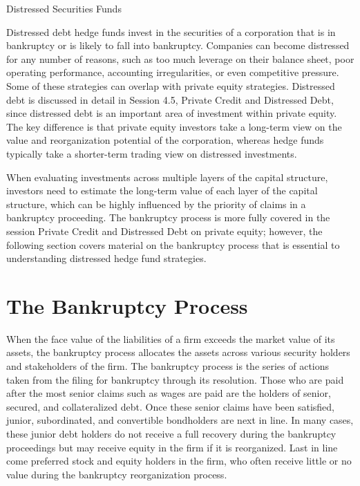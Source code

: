 \documentclass[11pt]{article}
\begin{document}
Distressed Securities Funds

Distressed debt hedge funds invest in the securities of a corporation that is in bankruptcy or is likely to fall into bankruptcy. Companies can become distressed for any number of reasons, such as too much leverage on their balance sheet, poor operating performance, accounting irregularities, or even competitive pressure. Some of these strategies can overlap with private equity strategies. Distressed debt is discussed in detail in Session 4.5, Private Credit and Distressed Debt, since distressed debt is an important area of investment within private equity. The key difference is that private equity investors take a long-term view on the value and reorganization potential of the corporation, whereas hedge funds typically take a shorter-term trading view on distressed investments.

When evaluating investments across multiple layers of the capital structure, investors need to estimate the long-term value of each layer of the capital structure, which can be highly influenced by the priority of claims in a bankruptcy proceeding. The bankruptcy process is more fully covered in the session Private Credit and Distressed Debt on private equity; however, the following section covers material on the bankruptcy process that is essential to understanding distressed hedge fund strategies.

\section*{The Bankruptcy Process}
When the face value of the liabilities of a firm exceeds the market value of its assets, the bankruptcy process allocates the assets across various security holders and stakeholders of the firm. The bankruptcy process is the series of actions taken from the filing for bankruptcy through its resolution. Those who are paid after the most senior claims such as wages are paid are the holders of senior, secured, and collateralized debt. Once these senior claims have been satisfied, junior, subordinated, and convertible bondholders are next in line. In many cases, these junior debt holders do not receive a full recovery during the bankruptcy proceedings but may receive equity in the firm if it is reorganized. Last in line come preferred stock and equity holders in the firm, who often receive little or no value during the bankruptcy reorganization process.
\end{document}
